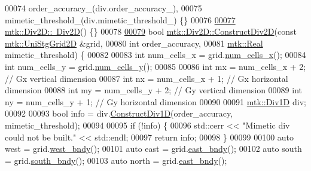 \begin{DoxyCode}
00074   order\_accuracy\_(div.order\_accuracy\_),
00075   mimetic\_threshold\_(div.mimetic\_threshold\_) \{\}
00076 
\hypertarget{mtk__div__2d_8cc_source_l00077}{}\hyperlink{classmtk_1_1Div2D_a5c10c0d7b974841e923ebe3fda67c468}{00077} \hyperlink{classmtk_1_1Div2D_a5c10c0d7b974841e923ebe3fda67c468}{mtk::Div2D::~Div2D}() \{\}
00078 
\hypertarget{mtk__div__2d_8cc_source_l00079}{}\hyperlink{classmtk_1_1Div2D_a4214055909a6b94fcb9d657cc839055f}{00079} \textcolor{keywordtype}{bool} \hyperlink{classmtk_1_1Div2D_a4214055909a6b94fcb9d657cc839055f}{mtk::Div2D::ConstructDiv2D}(\textcolor{keyword}{const} 
      \hyperlink{classmtk_1_1UniStgGrid2D}{mtk::UniStgGrid2D} &grid,
00080                                 \textcolor{keywordtype}{int} order\_accuracy,
00081                                 \hyperlink{group__c01-roots_gac080bbbf5cbb5502c9f00405f894857d}{mtk::Real} mimetic\_threshold) \{
00082 
00083   \textcolor{keywordtype}{int} num\_cells\_x = grid.\hyperlink{classmtk_1_1UniStgGrid2D_a2d182866a398aba8e4829590e85bf939}{num\_cells\_x}();
00084   \textcolor{keywordtype}{int} num\_cells\_y = grid.\hyperlink{classmtk_1_1UniStgGrid2D_aed05a801cc9a76dba0ff203cea58a61a}{num\_cells\_y}();
00085 
00086   \textcolor{keywordtype}{int} mx = num\_cells\_x + 2;  \textcolor{comment}{// Gx vertical dimension}
00087   \textcolor{keywordtype}{int} nx = num\_cells\_x + 1;  \textcolor{comment}{// Gx horizontal dimension}
00088   \textcolor{keywordtype}{int} my = num\_cells\_y + 2;  \textcolor{comment}{// Gy vertical dimension}
00089   \textcolor{keywordtype}{int} ny = num\_cells\_y + 1;  \textcolor{comment}{// Gy horizontal dimension}
00090 
00091   \hyperlink{classmtk_1_1Div1D}{mtk::Div1D} div;
00092 
00093   \textcolor{keywordtype}{bool} info = div.\hyperlink{classmtk_1_1Div1D_a52fcd1542f11e606e36bd188e48bfdf7}{ConstructDiv1D}(order\_accuracy, mimetic\_threshold);
00094 
00095   \textcolor{keywordflow}{if} (!info) \{
00096     std::cerr << \textcolor{stringliteral}{"Mimetic div could not be built."} << std::endl;
00097     \textcolor{keywordflow}{return} info;
00098   \}
00099 
00100   \textcolor{keyword}{auto} west = grid.\hyperlink{classmtk_1_1UniStgGrid2D_af2b1712387ded85edaf2b64617d3fc13}{west\_bndy}();
00101   \textcolor{keyword}{auto} east = grid.\hyperlink{classmtk_1_1UniStgGrid2D_a03f689eb29a6369b82ce1207c655d5ff}{east\_bndy}();
00102   \textcolor{keyword}{auto} south = grid.\hyperlink{classmtk_1_1UniStgGrid2D_a1442eaf219f099d0ebf46a170fdebf92}{south\_bndy}();
00103   \textcolor{keyword}{auto} north = grid.\hyperlink{classmtk_1_1UniStgGrid2D_a03f689eb29a6369b82ce1207c655d5ff}{east\_bndy}();

\end{DoxyCode}
